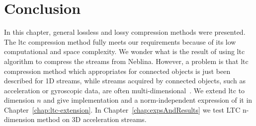 \section{Conclusion}


In this chapter, general lossless and lossy compression methods were presented.
The \acrshort{ltc} compression method fully meets our requirements because of
its low computational and space complexity. We wonder what is the result of
using \acrshort{ltc} algorithm to compress the streams from Neblina. However, a
problem is that \acrshort{ltc} compression method which appropriates for
connected objects is just been described for 1D streams, while streams acquired
by connected objects, such as acceleration or gyroscopic data, are often
multi-dimensional~\cite{li2018multi}. We extend \acrshort{ltc} to dimension $n$
and give implementation and a norm-independent expression of it in
Chapter~\ref{chap:ltc-extension}. In Chapter~\ref{chap:expsAndResults} we test
LTC n-dimension method on 3D acceleration streams. 

